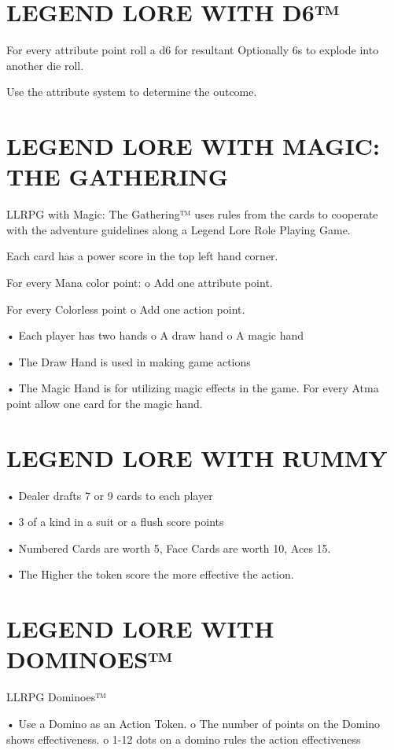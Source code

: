 \documentclass{article}
\begin{document}
\section{LEGEND LORE WITH D6™}

For every attribute point roll a d6 for resultant  Optionally 6s to explode into another die
roll.

Use the attribute system to determine the outcome.

\section{LEGEND LORE WITH MAGIC: THE GATHERING}

LLRPG with Magic: The Gathering™ uses rules from the cards to cooperate with the adventure
guidelines along a Legend Lore Role Playing Game. 

Each card has a power score in the top left hand corner.

For every Mana color point: o Add one attribute point.

For every Colorless point o Add one action point.

• Each player has two hands o A draw hand o A magic hand

• The Draw Hand is used in making game actions

• The Magic Hand is for utilizing magic effects in the game. For every Atma point allow
one card for the magic hand.

\section{LEGEND LORE WITH RUMMY}

• Dealer drafts 7 or 9 cards to each player

• 3 of a kind in a suit or a flush score points

• Numbered Cards are worth 5, Face Cards are worth 10, Aces 15.

• The Higher the token score the more effective the action.

\section{LEGEND LORE WITH DOMINOES™}

LLRPG Dominoes™

• Use a Domino as an Action Token. o The number of points on the Domino shows
effectiveness. o 1-12 dots on a domino rules the action effectiveness
\end{document}
